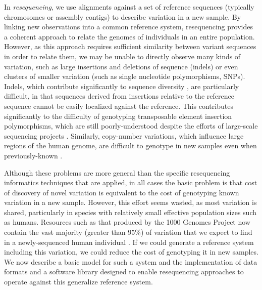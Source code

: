 \documentclass{article}
\begin{document}
In \emph{resequencing}, we use alignments against a set of reference sequences (typically chromosomes or assembly contigs) to describe variation in a new sample. By linking new observations into a common reference system, resequencing provides a coherent approach to relate the genomes of individuals in an entire population. However, as this approach requires sufficient similarity between variant sequences in order to relate them, we may be unable to directly observe many kinds of variation, such as large insertions and deletions of sequence (indels) or even clusters of smaller variation (such as single nucleotide polymorphisms, SNPs). Indels, which contribute significantly to sequence diversity \cite{mills2010}, are particularly difficult, in that sequences derived from insertions relative to the reference sequence cannot be easily localized against the reference. This contributes significantly to the difficulty of genotyping transposable element insertion polymorphisms, which are still poorly-understood despite the efforts of large-scale sequencing projects \cite{stewart2011}. Similarly, copy-number variations, which influence large regions of the human genome, are difficult to genotype in new samples even when previously-known \cite{sudmant2010}.

Although these problems are more general than the specific resequencing informatics techniques that are applied, in all cases the basic problem is that cost of discovery of novel variation is equivalent to the cost of genotyping known variation in a new sample. However, this effort seems wasted, as most variation is shared, particularly in species with relatively small effective population sizes such as humans. Resources such as that produced by the 1000 Genomes Project now contain the vast majority (greater than $95\%$) of variation that we expect to find in a newly-sequenced human individual \cite{1000Gphase1}. If we could generate a reference system including this variation, we could reduce the cost of genotyping it in new samples. We now describe a basic model for such a system and the implementation of data formats and a software library designed to enable resequencing approaches to operate against this generalize reference system.
\end{document}
